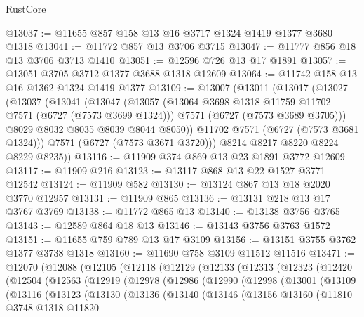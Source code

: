 \begin{lexlean}{RustCore}
\begin{coremodule}
@13037 := @11655 @857 @158 @13 @16 @3717 @1324 @1419 @1377 @3680 @1318
@13041 := @11772 @857 @13 @3706 @3715
@13047 := @11777 @856 @18 @13 @3706 @3713 @1410
@13051 := @12596 @726 @13 @17 @1891
@13057 := @13051 @3705 @3712 @1377 @3688 @1318 @12609
@13064 := @11742 @158 @13 @16 @1362 @1324 @1419 @1377
@13109 := @13007
    (@13011
      (@13017
        (@13027
          (@13037
            (@13041
              (@13047
                (@13057
                  (@13064 @3698 @1318 @11759 @11702 @7571 (@6727 (@7573 @3699 @1324)))
                  @7571
                  (@6727 (@7573 @3689 @3705)))
                @8029
                @8032
                @8035
                @8039
                @8044
                @8050))
            @11702
            @7571
            (@6727 (@7573 @3681 @1324)))
          @7571
          (@6727 (@7573 @3671 @3720)))
        @8214
        @8217
        @8220
        @8224
        @8229
        @8235))
@13116 := @11909 @374 @869 @13 @23 @1891 @3772 @12609
@13117 := @11909 @216
@13123 := @13117 @868 @13 @22 @1527 @3771 @12542
@13124 := @11909 @582
@13130 := @13124 @867 @13 @18 @2020 @3770 @12957
@13131 := @11909 @865
@13136 := @13131 @218 @13 @17 @3767 @3769
@13138 := @11772 @865 @13
@13140 := @13138 @3756 @3765
@13143 := @12589 @864 @18 @13
@13146 := @13143 @3756 @3763 @1572
@13151 := @11655 @759 @789 @13 @17 @3109
@13156 := @13151 @3755 @3762 @1377 @3738 @1318
@13160 := @11690 @758 @3109 @11512 @11516
@13471 := @12070
    (@12088
      (@12105
        (@12118
          (@12129
            (@12133
              (@12313
                (@12323
                  (@12420
                    (@12504
                      (@12563
                        (@12919
                          (@12978
                            (@12986
                              (@12990
                                (@12998
                                  (@13001
                                    (@13109
                                      (@13116
                                        (@13123
                                          (@13130
                                            (@13136
                                              (@13140
                                                (@13146
                                                  (@13156
                                                    @13160
                                                    (@11810
                                                      @3748
                                                      @1318
                                                      @11820

\end{coremodule}
\end{lexlean}
